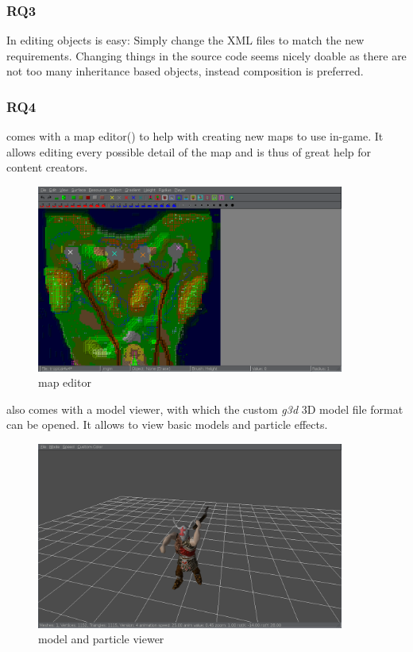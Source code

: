 \subsubsection{RQ3}
In \GLEST{} editing objects is easy: Simply change the XML files to match the new requirements. Changing things in the
source code seems nicely doable as there are not too many inheritance based objects, instead composition is preferred.

\subsubsection{RQ4}
\GLEST{} comes with a map editor() to help with creating new maps to use in-game. It allows editing every possible detail
of the map and is thus of great help for content creators. 
\begin{figure}[H]
    \centering
    \includegraphics[width=0.90\textwidth]{pics/glesteditor}
    \caption{\GLEST{} map editor}
    \label{fig:glestmapeditor}
\end{figure}

\pagebreak

\GLEST{} also comes with a model viewer, with which the
custom \textit{g3d} 3D model file format can be opened. It allows to view basic models and particle effects.

\begin{figure}[H]
    \centering
    \includegraphics[width=0.90\textwidth]{pics/glestmodelviewer}
    \caption{\GLEST{} model and particle viewer}
    \label{fig:glestmodelviewer}
\end{figure}

